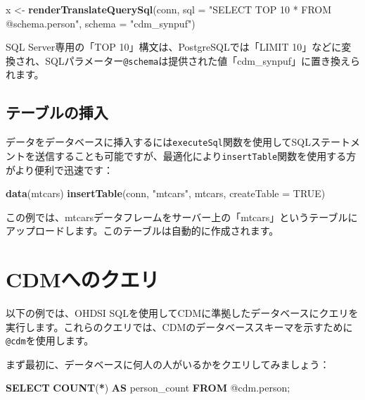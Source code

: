 \documentclass[
  11pt]{book}
\newenvironment{Shaded}{\begin{snugshade}}{\end{snugshade}}
\newcommand{\AttributeTok}[1]{\textcolor[rgb]{0.13,0.29,0.53}{#1}}
\newcommand{\ConstantTok}[1]{\textcolor[rgb]{0.56,0.35,0.01}{#1}}
\newcommand{\FunctionTok}[1]{\textcolor[rgb]{0.13,0.29,0.53}{\textbf{#1}}}
\newcommand{\KeywordTok}[1]{\textcolor[rgb]{0.13,0.29,0.53}{\textbf{#1}}}
\newcommand{\NormalTok}[1]{#1}
\newcommand{\OperatorTok}[1]{\textcolor[rgb]{0.81,0.36,0.00}{\textbf{#1}}}
\newcommand{\OtherTok}[1]{\textcolor[rgb]{0.56,0.35,0.01}{#1}}
\newcommand{\StringTok}[1]{\textcolor[rgb]{0.31,0.60,0.02}{#1}}
\theoremstyle{definition}
\theoremstyle{definition}
\theoremstyle{definition}
\theoremstyle{definition}
\theoremstyle{remark}
\begin{document}
\begin{Shaded}
\begin{Highlighting}[]
\NormalTok{x }\OtherTok{\textless{}{-}} \FunctionTok{renderTranslateQuerySql}\NormalTok{(conn,}
                             \AttributeTok{sql =} \StringTok{"SELECT TOP 10 * FROM @schema.person"}\NormalTok{,}
                             \AttributeTok{schema =} \StringTok{"cdm\_synpuf"}\NormalTok{)}
\end{Highlighting}
\end{Shaded}

SQL Server専用の「TOP 10」構文は、PostgreSQLでは「LIMIT 10」などに変換され、SQLパラメーター\texttt{@schema}は提供された値「cdm\_synpuf」に置き換えられます。

\subsection{テーブルの挿入}\label{ux30c6ux30fcux30d6ux30ebux306eux633fux5165}

データをデータベースに挿入するには\texttt{executeSql}関数を使用してSQLステートメントを送信することも可能ですが、最適化により\texttt{insertTable}関数を使用する方がより便利で迅速です：

\begin{Shaded}
\begin{Highlighting}[]
\FunctionTok{data}\NormalTok{(mtcars)}
\FunctionTok{insertTable}\NormalTok{(conn, }\StringTok{"mtcars"}\NormalTok{, mtcars, }\AttributeTok{createTable =} \ConstantTok{TRUE}\NormalTok{)}
\end{Highlighting}
\end{Shaded}

この例では、mtcarsデータフレームをサーバー上の「mtcars」というテーブルにアップロードします。このテーブルは自動的に作成されます。

\section{CDMへのクエリ}\label{QueryTheCdm}

以下の例では、OHDSI SQLを使用してCDMに準拠したデータベースにクエリを実行します。これらのクエリでは、CDMのデータベーススキーマを示すために\texttt{@cdm}を使用します。

まず最初に、データベースに何人の人がいるかをクエリしてみましょう：

\begin{Shaded}
\begin{Highlighting}[]
\KeywordTok{SELECT} \FunctionTok{COUNT}\NormalTok{(}\OperatorTok{*}\NormalTok{) }\KeywordTok{AS}\NormalTok{ person\_count }\KeywordTok{FROM}\NormalTok{ @cdm.person;}
\end{Highlighting}
\end{Shaded}
\end{document}
